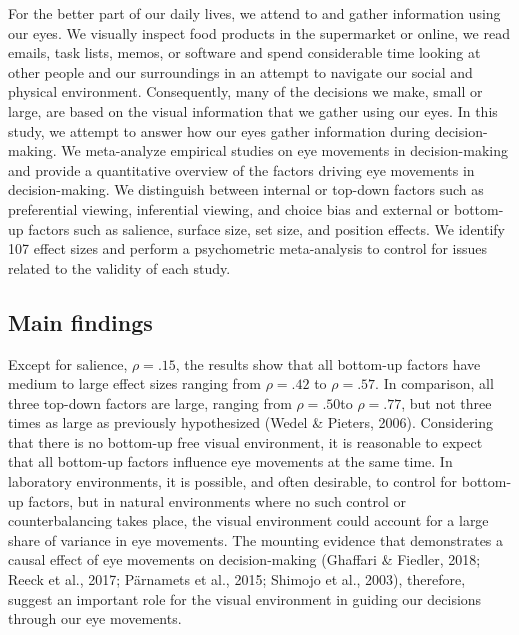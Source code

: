 \documentclass{article}
\begin{document}
For the better part of our daily lives, we attend to and gather information using our eyes. We visually inspect food products in the supermarket or online, we read emails, task lists, memos, or software and spend considerable time looking at other people and our surroundings in an attempt to navigate our social and physical environment. Consequently, many of the decisions we make, small or large, are based on the visual information that we gather using our eyes. In this study, we attempt to answer how our eyes gather information during decision-making. We meta-analyze empirical studies on eye movements in decision-making and provide a quantitative overview of the factors driving eye movements in decision-making. We distinguish between internal or top-down factors such as preferential viewing, inferential viewing, and choice bias and external or bottom-up factors such as salience, surface size, set size, and position effects. We identify 107 effect sizes and perform a psychometric meta-analysis to control for issues related to the validity of each study. 


\subsection{Main findings}

Except for salience, $\rho = .15$, the results show that all bottom-up factors have medium to large effect sizes ranging from $\rho = .42$ to $\rho = .57$. In comparison, all three top-down factors are large, ranging from $\rho = .50$to $\rho = .77$, but not three times as large as previously hypothesized (Wedel \& Pieters, 2006). Considering that there is no bottom-up free visual environment, it is reasonable to expect that all bottom-up factors influence eye movements at the same time. In laboratory environments, it is possible, and often desirable, to control for bottom-up factors, but in natural environments where no such control or counterbalancing takes place, the visual environment could account for a large share of variance in eye movements. The mounting evidence that demonstrates a causal effect of eye movements on decision-making (Ghaffari \& Fiedler, 2018; Reeck et al., 2017; Pärnamets et al., 2015; Shimojo et al., 2003), therefore, suggest an important role for the visual environment in guiding our decisions through our eye movements. 
\end{document}
